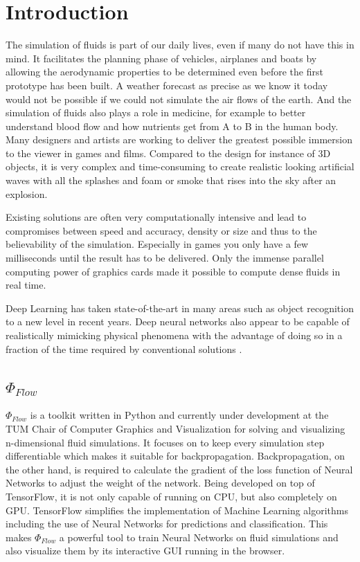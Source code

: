 \chapter{Introduction}\label{chapter:introduction}
The simulation of fluids is part of our daily lives, even if many do not have this in mind. It facilitates the planning phase of vehicles, airplanes and boats by allowing the aerodynamic properties to be determined even before the first prototype has been built. A weather forecast as precise as we know it today would not be possible if we could not simulate the air flows of the earth. And the simulation of fluids also plays a role in medicine, for example to better understand blood flow and how nutrients get from A to B in the human body. Many designers and artists are working to deliver the greatest possible immersion to the viewer in games and films. Compared to the design for instance of 3D objects, it is very complex and time-consuming to create realistic looking artificial waves with all the splashes and foam or smoke that rises into the sky after an explosion.
\par Existing solutions are often very computationally intensive and lead to compromises between speed and accuracy, density or size and thus to the believability of the simulation. Especially in games you only have a few milliseconds until the result has to be delivered. Only the immense parallel computing power of graphics cards made it possible to compute dense fluids in real time. 
\par Deep Learning has taken state-of-the-art in many areas such as object recognition to a new level in recent years. Deep neural networks also appear to be capable of realistically mimicking physical phenomena with the advantage of doing so in a fraction of the time required by conventional solutions \parencite{tompson2017accelerating}.
\section{$\Phi_\textit{Flow}$ }
$\Phi_\textit{Flow}$ is a toolkit written in Python and currently under development at the TUM Chair of Computer Graphics and Visualization for solving and visualizing n-dimensional fluid simulations. It focuses on to keep every simulation step differentiable which makes it suitable for backpropagation. Backpropagation, on the other hand, is required to calculate the gradient of the loss function of Neural Networks to adjust the weight of the network. Being developed on top of TensorFlow, it is not only capable of running on CPU, but also completely on GPU. TensorFlow simplifies the implementation of Machine Learning algorithms including the use of Neural Networks for predictions and classification. This makes $\Phi_\textit{Flow}$ a powerful tool to train Neural Networks on fluid simulations and also visualize them by its interactive GUI running in the browser. 
